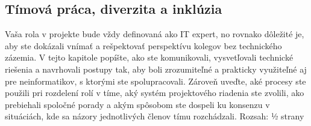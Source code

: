 \subsection{Tímová práca, diverzita a inklúzia}
Vaša rola v projekte bude vždy definovaná ako IT expert, no rovnako dôležité je, aby ste dokázali vnímať a rešpektovať perspektívu kolegov bez technického zázemia. V tejto kapitole popíšte, ako ste komunikovali, vysvetľovali technické riešenia a navrhovali postupy tak, aby boli zrozumiteľné a prakticky využiteľné aj pre neinformatikov, s ktorými ste spolupracovali. Zároveň uveďte, aké procesy ste použili pri rozdelení rolí v tíme, aký systém projektového riadenia ste zvolili, ako prebiehali spoločné porady a akým spôsobom ste dospeli ku konsenzu v situáciách, kde sa názory jednotlivých členov tímu rozchádzali. Rozsah: ½ strany